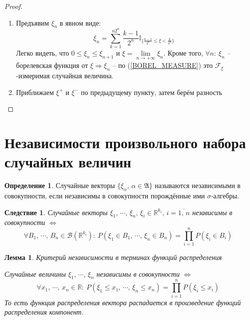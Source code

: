 \documentclass[a4paper,12pt]{article}
\renewcommand{\leq}{\ensuremath{\leqslant}}
\theoremstyle{plain}
\newtheorem{lemma}{Лемма}[section]
\newtheorem*{corollary}{Следствие}
\theoremstyle{definition}
\newtheorem{definition}{Определение}[section]
\theoremstyle{remark}
\begin{document}
\begin{proof}
	\begin{enumerate}
		\item Предъявим $\xi_n$ в явном виде:
		      \[\xi_n = \sum_{k = 1}^{n2^n}\frac{k - 1}{2^n}\mathbb{I}_{\{\frac{k - 1}{2^n} \leq \xi < \frac{k}{2^n}\}}\]
		      Легко видеть, что $0 \leq \xi_n \leq \xi_{n + 1}$ и $\xi = \lim\limits_{n \to +\infty} \xi_n$. Кроме того, $\forall n:\: \xi_n$ -- борелевская функция от $\xi \Rightarrow \xi_n$ -- по (\ref{BOREL_MEASURE}) это $\mathcal{F}_\xi$-измеримая случайная величина.
		\item Приближаем $\xi^+$ и $\xi^-$ по предыдущему пункту, затем берём разность
	\end{enumerate}
\end{proof}

\section{Независимости произвольного набора случайных величин}
\begin{definition}
	Случайные векторы $\{\xi_\alpha,\, \alpha \in \mathfrak{A}\}$ называются независимыми в совокупности, если независимы в совокупности порождённые ими $\sigma$-алгебры.
\end{definition}

\begin{corollary}
	Случайные векторы $\xi_1,\,\cdots,\,\xi_n,\, \xi_i \in \mathbb{R}^{k_i},\, i = \overline{1,\,n}$ независимы в совокупности $\Leftrightarrow$
	\[\forall B_1,\,\cdots,\,B_n \in \mathcal{B}(\mathbb{R}^{k_i}) :\: P(\xi_1 \in B_1,\,\cdots,\,\xi_n \in B_n) = \prod_{i = 1}^n P(\xi_i \in B_i)\]
\end{corollary}

\begin{lemma}
	Критерий независимости в терминах функций распределения

	Случайные величины $\xi_1,\,\cdots,\,\xi_n$ независимы в совокупности $\Leftrightarrow$
	\[\forall x_1,\,\cdots,\,x_n \in \mathbb{R} :\: P(\xi_1 \leq x_1,\,\cdots,\,\xi_n \leq x_n) = \prod_{i = 1}^n P(\xi_i \leq x_i)\]
	То есть функция распределения вектора распадается в произведение функций распределения компонент.
\end{lemma}
\end{document}

